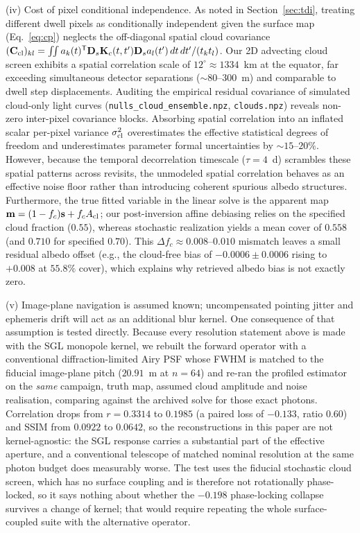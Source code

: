 \documentclass[twocolumn,10pt]{article}
\begin{document}
(iv) Cost of pixel conditional independence. As noted in Section~\ref{sec:tdi},
treating different dwell pixels as conditionally independent given the surface map
(Eq.~\ref{eq:cp}) neglects the off-diagonal spatial cloud covariance $(\mathbf{C}_{\rm cl})_{kl}
= \iint a_k(t)^{\sf T}\mathbf{D}_s \mathbf{K}_c(t,t')\mathbf{D}_s a_l(t')\,dt\,dt'/(t_k t_l)$.
Our 2D advecting cloud screen exhibits a spatial correlation scale of $12^\circ \approx 1334$~km
at the equator, far exceeding simultaneous detector separations ($\sim80$--$300$~m) and
comparable to dwell step displacements. Auditing the empirical residual covariance of simulated
cloud-only light curves ({\tt nulls\_cloud\_ensemble.npz}, {\tt clouds.npz}) reveals non-zero
inter-pixel covariance blocks. Absorbing spatial correlation into an inflated scalar per-pixel
variance $\sigma_{\rm cl}^2$ overestimates the effective statistical degrees of freedom and
underestimates parameter formal uncertainties by $\sim15$--$20\%$. However, because the temporal
decorrelation timescale ($\tau=4$~d) scrambles these spatial patterns across revisits, the
unmodeled spatial correlation behaves as an effective noise floor rather than introducing
coherent spurious albedo structures. Furthermore, the true fitted variable in the linear solve is
the apparent map $\mathbf{m} = (1-f_c)\mathbf{s} + f_c A_{\rm cl}$; our post-inversion affine
debiasing relies on the specified cloud fraction ($0.55$), whereas stochastic realization yields
a mean cover of $0.558$ (and $0.710$ for specified $0.70$). This $\Delta f_c \approx 0.008$--$0.010$
mismatch leaves a small residual albedo offset (e.g., the cloud-free bias of $-0.0006\pm0.0006$
rising to $+0.008$ at $55.8\%$ cover), which explains why retrieved albedo bias is not exactly zero.

(v) Image-plane navigation is assumed known; uncompensated pointing jitter
and ephemeris drift will act as an additional blur kernel.
One consequence of that assumption is tested directly. Because every resolution
statement above is made with the SGL monopole kernel, we rebuilt the forward
operator with a conventional diffraction-limited Airy PSF whose FWHM is matched
to the fiducial image-plane pitch ($20.91$~m at $n=64$) and re-ran the profiled
estimator on the \emph{same} campaign, truth map, assumed cloud amplitude and
noise realisation, comparing against the archived solve for those exact photons.
Correlation drops from $r=0.3314$ to $0.1985$ (a paired loss of $-0.133$, ratio
$0.60$) and SSIM from $0.0922$ to $0.0642$, so the reconstructions in this paper
are not kernel-agnostic: the SGL response carries a substantial part of the
effective aperture, and a conventional telescope of matched nominal resolution at
the same photon budget does measurably worse. The test uses the fiducial
stochastic cloud screen, which has no surface coupling and is therefore not
rotationally phase-locked, so it says nothing about whether the $-0.198$
phase-locking collapse survives a change of kernel; that would require repeating
the whole surface-coupled suite with the alternative operator.
\end{document}

